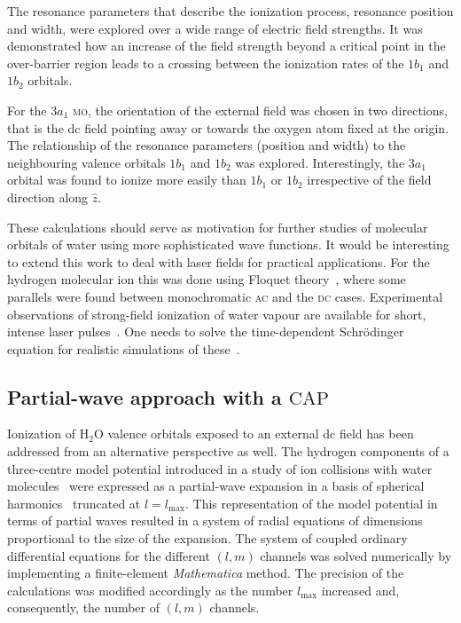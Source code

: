 The resonance parameters that describe the ionization process,
resonance position and width, were explored over a wide range of
electric field strengths. It was demonstrated how an increase of the
field strength beyond a critical point in the over-barrier region
leads to a crossing between the ionization rates of the $1b_{1}$ and
$1b_{2}$ orbitals.

For the $3a_{1}$ \textsc{mo}, the orientation of the external field
was chosen in two directions, that is the dc field pointing away or
towards the oxygen atom fixed at the origin. The relationship of the
resonance parameters (position and width) to the neighbouring valence
orbitals $1b_{1}$ and $1b_{2}$ was explored. Interestingly, the
$3a_{1}$ orbital was found to ionize more easily than $1b_{1}$ or
$1b_{2}$ irrespective of the field direction along $\hat{z}$.

These calculations should serve as motivation for further studies of
molecular orbitals of water using more sophisticated wave
functions. It would be interesting to extend this work to deal with
laser fields for practical applications. For the hydrogen molecular
ion this was done using Floquet theory~\cite{Tsog_H2mol_ac_2013},
where some parallels were found between monochromatic \textsc{ac} and
the \textsc{dc} cases. Experimental observations of strong-field
ionization of water vapour are available for short, intense laser
pulses~\cite{exp_h2o_laser_2008,exp_h2o_laser_2014}. One needs to
solve the time-dependent Schr\"{o}dinger equation for realistic
simulations of these~\cite{Farrell_2011,Falge_2010}.


\subsection*{Partial-wave approach with a $\mathrm{CAP}$}

Ionization of H$_{2}$O valence orbitals exposed to an external dc
field has been addressed from an alternative perspective as well. The
hydrogen components of a three-centre model potential introduced in a
study of ion collisions with water
molecules~\cite{illescas_modelV_2011} were expressed as a partial-wave
expansion in a basis of spherical harmonics~\cite{marko_partialwave}
truncated at $l = l_{\mathrm{max}}$. This representation of the model
potential in terms of partial waves resulted in a system of radial
equations of dimensions proportional to the size of the expansion. The
system of coupled ordinary differential equations for the different
$(l,m)$ channels was solved numerically by implementing a
finite-element \emph{Mathematica} method. The precision of the
calculations was modified accordingly as the number $l_{\mathrm{max}}$
increased and, consequently, the number of $(l,m)$ channels.

